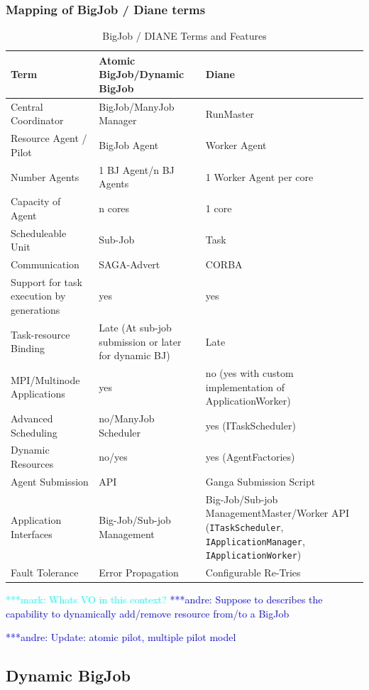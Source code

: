 \documentclass[]{article}
\newcommand{\alnote}[1]{ {\textcolor{blue} { ***andre: #1 }}}
\newcommand{\msnote}[1]{ {\textcolor{cyan} { ***mark: #1 }}}
\newcommand{\alnote}[1]{}
\begin{document}
\subsubsection{Mapping of BigJob / Diane terms}
\begin{table}[ht]
\centering
\begin{tabular}{|p{3.5cm}|p{5.9cm}|p{5.7cm}|}
\hline
\textbf{Term} &\textbf{Atomic BigJob/Dynamic BigJob} &\textbf{Diane}  \\
\hline
Central Coordinator &BigJob/ManyJob Manager & RunMaster \\ 
\hline
Resource Agent / Pilot &BigJob Agent  & Worker Agent \\
\hline
Number Agents &1 BJ Agent/n BJ Agents & 1 Worker Agent per core \\
\hline
Capacity of Agent &n cores & 1 core\\
\hline
Scheduleable Unit&Sub-Job &  Task \\
\hline
Communication &SAGA-Advert & CORBA\\
\hline
Support for task execution by generations  &yes &yes\\  
\hline
Task-resource Binding &Late (At sub-job submission or later for dynamic BJ) &Late\\
\hline
MPI/Multinode Applications &yes &no (yes with custom implementation of ApplicationWorker)\\
\hline
Advanced Scheduling &no/ManyJob Scheduler &yes (ITaskScheduler)\\
\hline
Dynamic Resources &no/yes &yes (AgentFactories)\\
\hline
Agent Submission &API &Ganga Submission Script\\
\hline
Application Interfaces &Big-Job/Sub-job Management &Big-Job/Sub-job 
Management\linebreak[4] Master/Worker API (\texttt{ITaskScheduler}, 
\texttt{IApplicationManager}, \texttt{IApplicationWorker}) \\
\hline
Fault Tolerance &Error Propagation &Configurable Re-Tries\\
\hline
\end{tabular}
\caption{BigJob / DIANE Terms and Features}
\end{table}

\msnote{Whats VO in this context?}\alnote{Suppose to describes the capability to dynamically add/remove resource from/to a BigJob}


\alnote{Update: atomic pilot, multiple pilot model}


\subsection{Dynamic BigJob}
\end{document}
